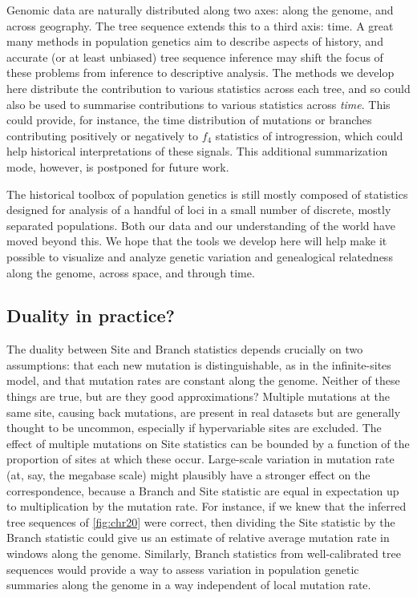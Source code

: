 \documentclass{article}
\begin{document}
Genomic data are naturally distributed along two axes: along the genome, and across geography.
The tree sequence extends this to a third axis: time.
A great many methods in population genetics aim to describe aspects of history,
and accurate (or at least unbiased) tree sequence inference
may shift the focus of these problems from inference to descriptive analysis.
The methods we develop here distribute the contribution to various statistics across each tree,
and so could also be used to summarise contributions to various statistics across \emph{time}.
This could provide, for instance, the time distribution of mutations or branches
contributing positively or negatively to $f_4$ statistics of introgression,
which could help historical interpretations of these signals.
This additional summarization mode, however, is postponed for future work.

The historical toolbox of population genetics
is still mostly composed of statistics designed for analysis of a handful of loci
in a small number of discrete, mostly separated populations.
Both our data and our understanding of the world have moved beyond this.
We hope that the tools we develop here will help make it possible
to visualize and analyze genetic variation and genealogical relatedness
along the genome, across space, and through time.



\subsection*{Duality in practice?}

The duality between Site and Branch statistics depends crucially on two assumptions:
that each new mutation is distinguishable, as in the infinite-sites model,
and that mutation rates are constant along the genome.
Neither of these things are true, but are they good approximations?
Multiple mutations at the same site, causing back mutations,
are present in real datasets but are generally thought to be uncommon,
especially if hypervariable sites are excluded.
The effect of multiple mutations on Site statistics
can be bounded by a function of the proportion of sites at which these occur.
Large-scale variation in mutation rate (at, say, the megabase scale)
might plausibly have a stronger effect on the correspondence,
because a Branch and Site statistic are equal in expectation up to multiplication by the mutation rate.
For instance, if we knew that the inferred tree sequences of \autoref{fig:chr20} were correct,
then dividing the Site statistic by the Branch statistic
could give us an estimate of relative average mutation rate in windows along the genome.
Similarly, Branch statistics from well-calibrated tree sequences
would provide a way to assess variation in population genetic summaries along the genome
in a way independent of local mutation rate.
\end{document}
